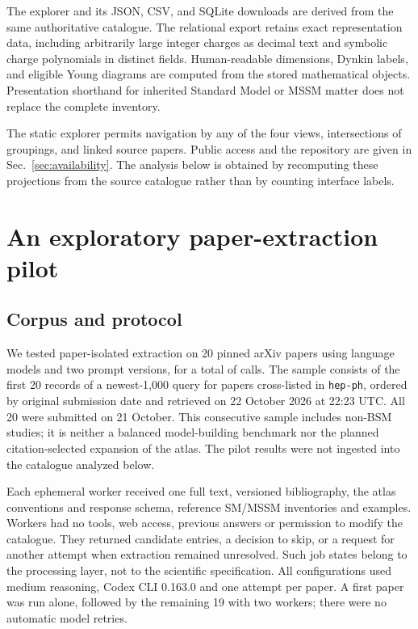 The explorer and its JSON, CSV, and SQLite downloads are derived from the same authoritative catalogue. The relational export retains exact representation data, including arbitrarily large integer charges as decimal text and symbolic charge polynomials in distinct fields. Human-readable dimensions, Dynkin labels, and eligible Young diagrams are computed from the stored mathematical objects. Presentation shorthand for inherited Standard Model or MSSM matter does not replace the complete inventory.

The static explorer permits navigation by any of the four views, intersections of groupings, and linked source papers. Public access and the repository are given in Sec.~\ref{sec:availability}. The analysis below is obtained by recomputing these projections from the source catalogue rather than by counting interface labels.

\section{An exploratory paper-extraction pilot}
\label{sec:pilot}

\subsection{Corpus and protocol}

We tested paper-isolated extraction on 20 pinned arXiv papers using \PilotModels{} language models and two prompt versions, for a total of \PilotCalls{} calls. The sample consists of the first 20 records of a newest-1,000 query for papers cross-listed in \texttt{hep-ph}, ordered by original submission date and retrieved on 22 October 2026 at 22:23 UTC. All 20 were submitted on 21 October. This consecutive sample includes non-BSM studies; it is neither a balanced model-building benchmark nor the planned citation-selected expansion of the atlas. The pilot results were not ingested into the catalogue analyzed below.

Each ephemeral worker received one full text, versioned bibliography, the atlas conventions and response schema, reference SM/MSSM inventories and examples. Workers had no tools, web access, previous answers or permission to modify the catalogue. They returned candidate entries, a decision to skip, or a request for another attempt when extraction remained unresolved. Such job states belong to the processing layer, not to the scientific specification. All configurations used medium reasoning, Codex CLI 0.163.0 and one attempt per paper. A first paper was run alone, followed by the remaining 19 with two workers; there were no automatic model retries.

